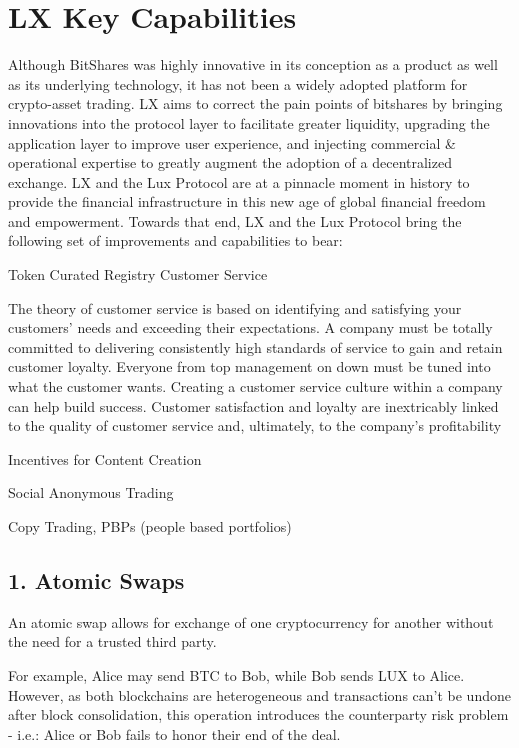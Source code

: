 \documentclass[11pt]{article}
\begin{document}
\section{LX Key Capabilities}

Although BitShares was highly innovative in its conception as a product as well as its underlying technology, it has not been a widely adopted platform for crypto-asset trading. LX aims to correct the pain points of bitshares by bringing innovations into the protocol layer to facilitate greater liquidity, upgrading the application layer to improve user experience, and injecting commercial \& operational expertise to greatly augment the adoption of a decentralized exchange. LX and the Lux Protocol are at a pinnacle moment in history to provide the financial infrastructure in this new age of global financial freedom and empowerment. Towards that end, LX and the Lux Protocol bring the following set of improvements and capabilities to bear:


Token Curated Registry Customer Service


The theory of customer service is based on identifying and satisfying your customers' needs and exceeding their expectations. A company must be totally committed to delivering consistently high standards of service to gain and retain customer loyalty. Everyone from top management on down must be tuned into what the customer wants. Creating a customer service culture within a company can help build success. Customer satisfaction and loyalty are inextricably linked to the quality of customer service and, ultimately, to the company's profitability


Incentives for Content Creation


Social Anonymous Trading


Copy Trading, PBPs (people based portfolios)


\subsection{1. Atomic Swaps}

An atomic swap allows for exchange of one cryptocurrency for another without the need for a trusted third party.


For example, Alice may send BTC to Bob, while Bob sends LUX to Alice. However, as both blockchains are heterogeneous and transactions can't be undone after block consolidation, this operation introduces the counterparty risk problem - i.e.: Alice or Bob fails to honor their end of the deal.
\end{document}
